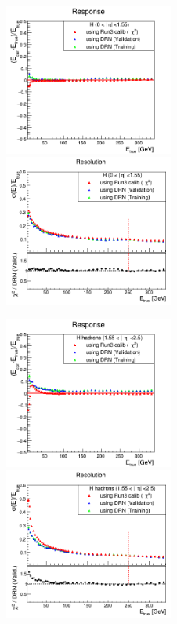 \begin{figure}
\includegraphics[width=0.495\textwidth]{./plots_pdf/HCAL_plots/Trained_target_ratioflip_0_500_10/pdf/H_barrel/barrel_corrEtaBarrelHcal.png}
\includegraphics[width=0.495\textwidth]{./plots_pdf/HCAL_plots/Trained_target_ratioflip_0_500_10/pdf/H_barrel/barrel_corrEtaBarrelHcal_reso.png}

\includegraphics[width=0.495\textwidth]{./plots_pdf/HCAL_plots/Trained_target_ratioflip_0_500_10/pdf/H_ec_in/EC_within_tracker_corrEtaEndcapHcal.png}
\includegraphics[width=0.495\textwidth]{./plots_pdf/HCAL_plots/Trained_target_ratioflip_0_500_10/pdf/H_ec_in/EC_within_tracker_corrEtaEndcapHcal_reso.png}


\end{figure}
